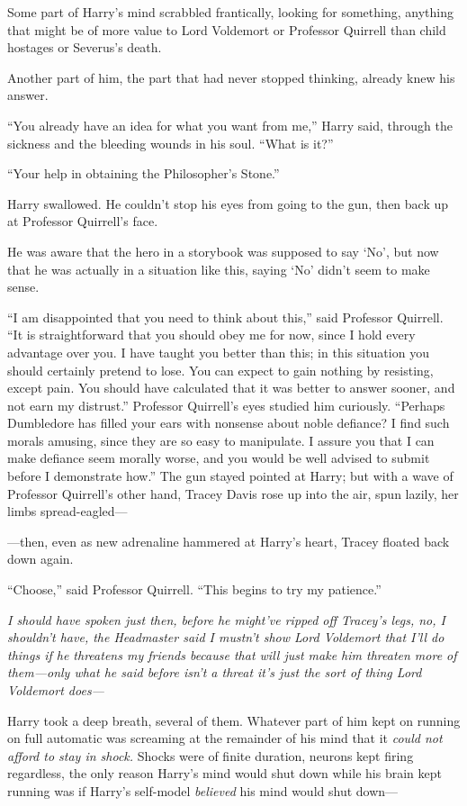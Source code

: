 Some part of Harry’s mind scrabbled frantically, looking for something, anything that might be of more value to Lord Voldemort or Professor Quirrell than child hostages or Severus’s death.

Another part of him, the part that had never stopped thinking, already knew his answer.

“You already have an idea for what you want from me,” Harry said, through the sickness and the bleeding wounds in his soul. “What is it?”

“Your help in obtaining the Philosopher’s Stone.”

Harry swallowed. He couldn’t stop his eyes from going to the gun, then back up at Professor Quirrell’s face.

He was aware that the hero in a storybook was supposed to say ‘No’, but now that he was actually in a situation like this, saying ‘No’ didn’t seem to make sense.

“I am disappointed that you need to think about this,” said Professor Quirrell. “It is straightforward that you should obey me for now, since I hold every advantage over you. I have taught you better than this; in this situation you should certainly pretend to lose. You can expect to gain nothing by resisting, except pain. You should have calculated that it was better to answer sooner, and not earn my distrust.” Professor Quirrell’s eyes studied him curiously. “Perhaps Dumbledore has filled your ears with nonsense about noble defiance? I find such morals amusing, since they are so easy to manipulate. I assure you that I can make defiance seem morally worse, and you would be well advised to submit before I demonstrate how.” The gun stayed pointed at Harry; but with a wave of Professor Quirrell’s other hand, Tracey Davis rose up into the air, spun lazily, her limbs spread-eagled—

—then, even as new adrenaline hammered at Harry’s heart, Tracey floated back down again.

“Choose,” said Professor Quirrell. “This begins to try my patience.”

\emph{I should have spoken just then, before he might’ve ripped off Tracey’s legs, no, I shouldn’t have, the Headmaster said I mustn’t show Lord Voldemort that I’ll do things if he threatens my friends because that will just make him threaten more of them—only what he said before isn’t a \emph{threat} it’s just the sort of thing Lord Voldemort \emph{does}—}

Harry took a deep breath, several of them. Whatever part of him kept on running on full automatic was screaming at the remainder of his mind that it \emph{could not afford to stay in shock.} Shocks were of finite duration, neurons kept firing regardless, the only reason Harry’s mind would shut down while his brain kept running was if Harry’s self-model \emph{believed} his mind would shut down—

